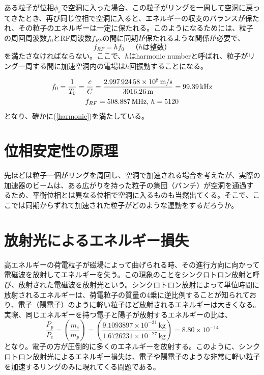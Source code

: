 \documentclass[10pt,a4paper]{ltjsarticle}
\begin{document}
ある粒子が位相$\phi_s$で空洞に入った場合、この粒子がリングを一周して空洞に戻ってきたとき、再び同じ位相で空洞に入ると、エネルギーの収支のバランスが保たれ、その粒子のエネルギーは一定に保たれる。このようになるためには、粒子の周回周波数$f_0$とRF周波数$f_{RF}$の間に同期が保たれるような関係が必要で、
%
\begin{equation}
  f_{RF}=h f_0 \quad（hは整数）
  \label{harmonic}
\end{equation}
%
を満たさなければならない。ここで、$h$はharmonic numberと呼ばれ、粒子がリング一周する間に加速空洞内の電場は$h$回振動することになる。

\begin{tcolorbox}[title=\textgt{KEKBにおける$f_0$, $f_{RF}$, $h$}の関係]
%
\begin{gather}
  f_0 = \frac{1}{T_0}=\frac{c}{C}=\frac{\SI{2.99792458e8}{\meter / \second}}{\SI{3016.26}{\meter}}=\SI{99.39}{\kilo\hertz} \notag \\
  f_{RF}=\SI{508.887}{\mega\hertz},\,h=5120 \notag
\end{gather}
%
となり、確かに(\ref{harmonic})を満たしている。
\end{tcolorbox}

\section{位相安定性の原理}
先ほどは粒子一個がリングを周回し、空洞で加速される場合を考えたが、実際の加速器のビームは、ある広がりを持った粒子の集団（バンチ）が空洞を通過するため、平衡位相とは異なる位相で空洞に入るものも当然出てくる。そこで、ここでは同期からずれて加速された粒子がどのような運動をするだろうか。

\section{放射光によるエネルギー損失}
高エネルギーの荷電粒子が磁場によって曲げられる時、その進行方向に向かって電磁波を放射してエネルギーを失う。この現象のことをシンクロトロン放射と呼び、放射された電磁波を放射光という。シンクロトロン放射によって単位時間に放射されるエネルギーは、荷電粒子の質量の4乗に逆比例することが知られており、電子（陽電子）のように軽い粒子ほど放射されるエネルギーは大きくなる。実際、同じエネルギーを持つ電子と陽子が放射するエネルギーの比は、
%
\begin{equation}
  \frac{P_{p}}{P_{e}} = \left(\frac{m_e}{m_p}\right)=\left(\frac{9.1093897\times 10^{-31}\,\mathrm{kg}}{1.6726231\times 10^{-27}\,\mathrm{kg}}\right)=8.80\times 10^{-14}
  \label{eq4}
\end{equation}
%
となり。電子の方が圧倒的に多くのエネルギーを放射する。このように、シンクロトロン放射光によるエネルギー損失は、電子や陽電子のような非常に軽い粒子を加速するリングのみに現れてくる問題である。
\end{document}
